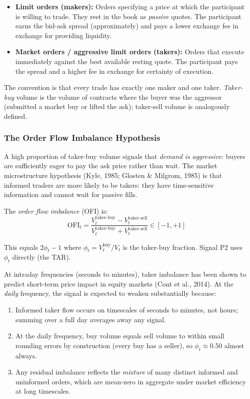 \documentclass[12pt, a4paper]{article}
\theoremstyle{plain}
\theoremstyle{definition}
\begin{document}
\begin{itemize}
  \item \textbf{Limit orders (makers):} Orders specifying a price at
        which the participant is willing to trade. They rest in the book
        as \emph{passive} quotes. The participant earns the bid-ask
        spread (approximately) and pays a lower exchange fee in exchange
        for providing liquidity.

  \item \textbf{Market orders / aggressive limit orders (takers):}
        Orders that execute immediately against the best available
        resting quote. The participant pays the spread and a higher fee
        in exchange for certainty of execution.
\end{itemize}

The convention is that every trade has exactly one maker and one taker.
\emph{Taker-buy} volume is the volume of contracts where the buyer was
the aggressor (submitted a market buy or lifted the ask); taker-sell
volume is analogously defined.

\subsubsection{The Order Flow Imbalance Hypothesis}

A high proportion of taker-buy volume signals that \emph{demand is
aggressive}: buyers are sufficiently eager to pay the ask price rather
than wait. The market microstructure hypothesis (Kyle, 1985; Glosten \& Milgrom, 1985)
is that informed traders are more likely to be takers:
they have time-sensitive information and cannot wait for passive fills.

The \emph{order flow imbalance} (OFI) is:
\begin{equation}
  \mathrm{OFI}_t = \frac{V^{\text{taker-buy}}_t - V^{\text{taker-sell}}_t}
                        {V^{\text{taker-buy}}_t + V^{\text{taker-sell}}_t}
  \in [-1, +1]
\end{equation}

This equals $2\phi_t - 1$ where $\phi_t = V^{\text{buy}}_t / V_t$ is
the taker-buy fraction.  Signal P2 uses $\phi_t$ directly (the TAR).

At intraday frequencies (seconds to minutes), taker imbalance has been
shown to predict short-term price impact in equity markets (Cont et al., 2014).  At the \emph{daily} frequency, the signal is expected
to weaken substantially because:

\begin{enumerate}
  \item Informed taker flow occurs on timescales of seconds to minutes,
        not hours; summing over a full day averages away any signal.
  \item At the daily frequency, buy volume equals sell volume to within
        small rounding errors by construction (every buy has a seller),
        so $\phi_t \approx 0.50$ almost always.
  \item Any residual imbalance reflects the \emph{mixture} of many
        distinct informed and uninformed orders, which are mean-zero
        in aggregate under market efficiency at long timescales.
\end{enumerate}
\end{document}
